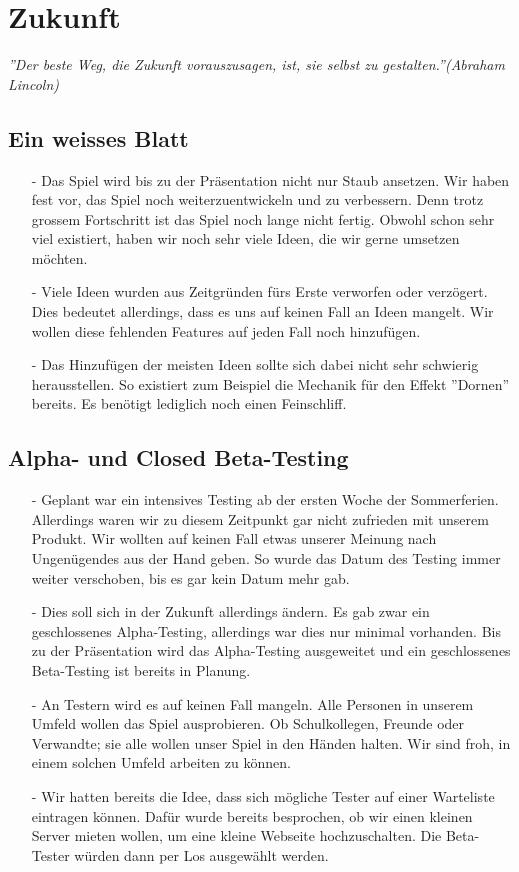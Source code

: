 \chapter{Zukunft}
\textit{''Der beste Weg, die Zukunft vorauszusagen, ist, sie selbst zu gestalten.''(Abraham Lincoln)}

\section{Ein weisses Blatt}
\begin{itemize}
    \item[-] Das Spiel wird bis zu der Präsentation nicht nur Staub ansetzen. Wir haben fest vor, das Spiel noch weiterzuentwickeln und zu verbessern. Denn trotz grossem Fortschritt
    ist das Spiel noch lange nicht fertig. Obwohl schon sehr viel existiert, haben wir noch sehr viele Ideen, die wir gerne umsetzen möchten.
    \item[-] Viele Ideen wurden aus Zeitgründen fürs Erste verworfen oder verzögert. Dies bedeutet allerdings, dass es uns auf keinen Fall an Ideen mangelt. Wir wollen diese
    fehlenden Features auf jeden Fall noch hinzufügen.
    \item[-] Das Hinzufügen der meisten Ideen sollte sich dabei nicht sehr schwierig herausstellen. So existiert zum Beispiel die Mechanik für den Effekt ''Dornen'' bereits. 
    Es benötigt lediglich noch einen Feinschliff. 
\end{itemize}

\section{Alpha- und Closed Beta-Testing}
\begin{itemize}
    \item[-] Geplant war ein intensives Testing ab der ersten Woche der Sommerferien. Allerdings waren wir zu diesem Zeitpunkt gar nicht zufrieden mit unserem Produkt. Wir wollten
    auf keinen Fall etwas unserer Meinung nach Ungenügendes aus der Hand geben. So wurde das Datum des Testing immer weiter verschoben, bis es gar kein Datum mehr gab.
    \item[-] Dies soll sich in der Zukunft allerdings ändern. Es gab zwar ein geschlossenes Alpha-Testing, allerdings war dies nur minimal vorhanden. Bis zu der Präsentation wird
    das Alpha-Testing ausgeweitet und ein geschlossenes Beta-Testing ist bereits in Planung. 
    \item[-] An Testern wird es auf keinen Fall mangeln. Alle Personen in unserem Umfeld wollen
    das Spiel ausprobieren. Ob Schulkollegen, Freunde oder Verwandte; sie alle wollen unser Spiel in den Händen halten. Wir sind froh, in einem solchen Umfeld arbeiten zu können.
    \item[-] Wir hatten bereits die Idee, dass sich mögliche Tester auf einer Warteliste eintragen können. Dafür wurde bereits besprochen, ob wir einen kleinen Server mieten wollen,
    um eine kleine Webseite hochzuschalten. Die Beta-Tester würden dann per Los ausgewählt werden.
\end{itemize}


